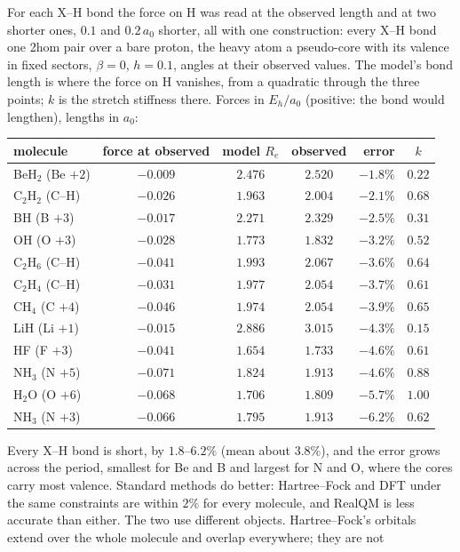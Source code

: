 For each X--H bond the force on H was read at the observed length and at two shorter ones, $0.1$ and $0.2\,a_0$
shorter, all with one construction: every X--H bond one 2hom pair over a bare proton, the heavy atom a pseudo-core
with its valence in fixed sectors, $\beta = 0$, $h = 0.1$, angles at their observed values. The model's bond length
is where the force on H vanishes, from a quadratic through the three points; $k$ is the stretch stiffness there.
Forces in $E_h/a_0$ (positive: the bond would lengthen), lengths in $a_0$:
\begin{center}
\small
\begin{tabular}{lcccrc}
\toprule
molecule & force at observed & model $R_e$ & observed & error & $k$ \\
\midrule
BeH$_2$ (Be $+2$) & $-0.009$ & $2.476$ & $2.520$ & $-1.8\%$ & $0.22$ \\
C$_2$H$_2$ (C--H) & $-0.026$ & $1.963$ & $2.004$ & $-2.1\%$ & $0.68$ \\
BH (B $+3$) & $-0.017$ & $2.271$ & $2.329$ & $-2.5\%$ & $0.31$ \\
OH (O $+3$) & $-0.028$ & $1.773$ & $1.832$ & $-3.2\%$ & $0.52$ \\
C$_2$H$_6$ (C--H) & $-0.041$ & $1.993$ & $2.067$ & $-3.6\%$ & $0.64$ \\
C$_2$H$_4$ (C--H) & $-0.031$ & $1.977$ & $2.054$ & $-3.7\%$ & $0.61$ \\
CH$_4$ (C $+4$) & $-0.046$ & $1.974$ & $2.054$ & $-3.9\%$ & $0.65$ \\
LiH (Li $+1$) & $-0.015$ & $2.886$ & $3.015$ & $-4.3\%$ & $0.15$ \\
HF (F $+3$) & $-0.041$ & $1.654$ & $1.733$ & $-4.6\%$ & $0.61$ \\
NH$_3$ (N $+5$) & $-0.071$ & $1.824$ & $1.913$ & $-4.6\%$ & $0.88$ \\
H$_2$O (O $+6$) & $-0.068$ & $1.706$ & $1.809$ & $-5.7\%$ & $1.00$ \\
NH$_3$ (N $+3$) & $-0.066$ & $1.795$ & $1.913$ & $-6.2\%$ & $0.62$ \\
\bottomrule
\end{tabular}
\end{center}
Every X--H bond is short, by $1.8$--$6.2\%$ (mean about $3.8\%$), and the error grows across the period, smallest
for Be and B and largest for N and O, where the cores carry most valence. Standard methods do better: Hartree--Fock and DFT under the same constraints are within $2\%$
for every molecule, and RealQM is less accurate than either. The two use different objects. Hartree--Fock's orbitals extend over the whole molecule and overlap everywhere; they are not

